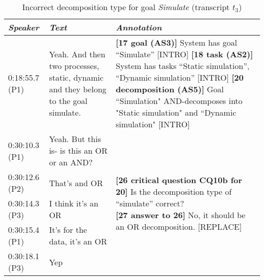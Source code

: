 \begin{table}[!htbp]
\begin{tabular}{|p{17mm}|p{43mm}|p{90mm}|}
\hline
\textit{Speaker} & \textit{Text} & \textit{Annotation}\\
\hline
0:18:55.7 (P1) &Yeah. And then two processes, static, dynamic and they belong to the goal simulate. & \textbf{[17 goal (AS3)]} System has goal ``Simulate'' \textsf{[INTRO]}\newline
\textbf{[18 task (AS2)]} System has tasks ``Static simulation'', ``Dynamic simulation'' \textsf{[INTRO]}\newline  
\textbf{[20 decomposition (AS5)]} Goal ``Simulation" AND-decomposes into "Static simulation" and ``Dynamic simulation" \textsf{[INTRO]}\\
\hline
0:30:10.3 (P1) & 	Yeah. But this is- is this an OR or an AND? & \multirow{5}{80mm}{\textbf{[26 critical question CQ10b for 20]} Is the decomposition type of ``simulate'' correct?\newline
\textbf{[27 answer to 26]} No, it should be an OR decomposition. \textsf{[REPLACE]}}\\
\cline{1-2}
0:30:12.6 (P2) & That's and OR &\\
\cline{1-2}
0:30:14.3 (P3) & I think it's an OR &\\
\cline{1-2}
0:30:15.4 (P1) & It's for the data, it's an OR &\\
\cline{1-2}
0:30:18.1 (P3) & Yep &\\
\hline	
\end{tabular}
\caption{Incorrect decomposition type for goal \emph{Simulate} (transcript $t_3$)}
\label{table:transcript:decomposition}
\end{table}

